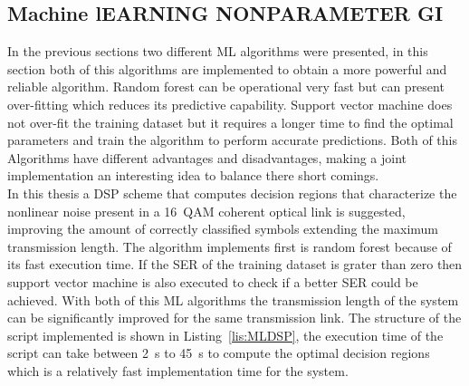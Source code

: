 \subsection{Machine lEARNING NONPARAMETER GI  }
In the previous sections two different ML algorithms were presented, in this section both of this algorithms are implemented to obtain a more powerful and reliable algorithm. Random forest can be operational very fast but can present over-fitting which reduces its predictive capability. Support vector machine does not over-fit the training dataset but it requires a longer time to find the optimal parameters and train the algorithm to perform accurate predictions. Both of this Algorithms have different advantages and disadvantages, making a joint implementation an interesting idea to balance there short comings.~\\

In this thesis a DSP scheme that computes decision regions that characterize the nonlinear noise present in a 16~QAM coherent optical link is suggested, improving the amount of correctly classified symbols extending the maximum transmission length. The algorithm implements first is random forest because of its fast execution time. If the SER of the training dataset is grater than zero then support vector machine is also executed to check if a better SER could be achieved. With both of this ML algorithms the transmission length of the system can be significantly improved for the same transmission link. The structure of the script implemented is shown in Listing~\ref{lis:MLDSP}, the execution time of the script can take between 2~s to 45~s to compute the optimal decision regions which is a relatively fast implementation time for the system.~\\								    

